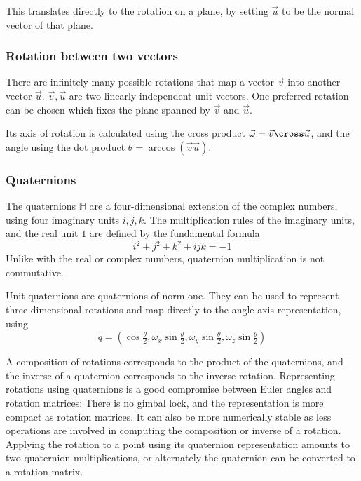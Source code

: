 This translates directly to the rotation on a plane, by setting $\vec{u}$ to be the normal vector of that plane.


\subsubsection{Rotation between two vectors}
There are infinitely many possible rotations that map a vector $\vec{v}$ into another vector $\vec{u}$. $\vec{v}, \vec{u}$ are two linearly independent unit vectors. One preferred rotation can be chosen which fixes the plane spanned by $\vec{v}$ and $\vec{u}$.

Its axis of rotation is calculated using the cross product $\vec{\omega} = \vec{v} \cross \vec{u}$, and the angle using the dot product $\theta = \arccos (\vec{v} \vec{u})$.


\subsubsection{Quaternions}
The quaternions $\mathbb{H}$ are a four-dimensional extension of the complex numbers, using four imaginary units $i, j, k$. The multiplication rules of the imaginary units, and the real unit $1$ are defined by the fundamental formula
\begin{equation}
i^2 + j^2 + k^2 + i j k = -1
\end{equation}
Unlike with the real or complex numbers, quaternion multiplication is not commutative.

Unit quaternions are quaternions of norm one. They can be used to represent three-dimensional rotations and map directly to the angle-axis representation, using
\begin{equation}
\dot{q} = \left( \cos \tfrac{\theta}{2}, \omega_x \sin \tfrac{\theta}{2}, \omega_y \sin \tfrac{\theta}{2}, \omega_z \sin \tfrac{\theta}{2} \right)
\end{equation}

A composition of rotations corresponds to the product of the quaternions, and the inverse of a quaternion corresponds to the inverse rotation. Representing rotations using quaternions is a good compromise between Euler angles and rotation matrices: There is no gimbal lock, and the representation is more compact as rotation matrices. It can also be more numerically stable as less operations are involved in computing the composition or inverse of a rotation. Applying the rotation to a point using its quaternion representation amounts to two quaternion multiplications, or alternately the quaternion can be converted to a rotation matrix.


